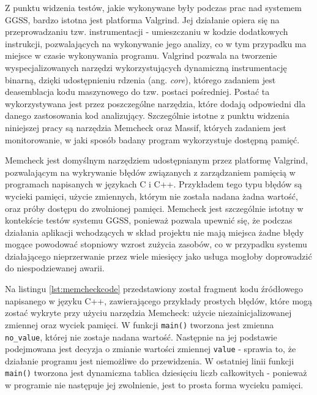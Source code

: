 Z punktu widzenia testów, jakie wykonywane były podczas prac nad systemem GGSS, bardzo istotna jest platforma Valgrind. Jej działanie opiera się na przeprowadzaniu tzw. instrumentacji - umieszczaniu w kodzie dodatkowych instrukcji, pozwalających na wykonywanie jego analizy, co w tym przypadku ma miejsce w czasie wykonywania programu. Valgrind pozwala na tworzenie wyspecjalizowanych narzędzi wykorzystujących dynamiczną instrumentację binarną, dzięki udostępnieniu rdzenia (ang. \emph{core}), którego zadaniem jest deasemblacja kodu maszynowego do tzw. postaci pośredniej. Postać ta wykorzystywana jest przez poszczególne narzędzia, które dodają odpowiedni dla danego zastosowania kod analizujący. Szczególnie istotne z punktu widzenia niniejszej pracy są narzędzia Memcheck oraz Massif, których zadaniem jest monitorowanie, w jaki sposób badany program wykorzystuje dostępną pamięć.

Memcheck jest domyślnym narzędziem udostępnianym przez platformę Valgrind, pozwalającym na wykrywanie błędów związanych z zarządzaniem pamięcią w programach napisanych w językach C i C++. Przykładem tego typu błędów są wycieki pamięci, użycie zmiennych, którym nie została nadana żadna wartość, oraz próby dostępu do zwolnionej pamięci. Memcheck jest szczególnie istotny w kontekście testów systemu GGSS, ponieważ pozwala upewnić się, że podczas działania aplikacji wchodzących w skład projektu nie mają miejsca żadne błędy mogące powodować stopniowy wzrost zużycia zasobów, co w przypadku systemu działającego nieprzerwanie przez wiele miesięcy jako usługa mogłoby doprowadzić do niespodziewanej awarii. 

Na listingu \ref{lst:memcheckcode} przedstawiony został fragment kodu źródłowego napisanego w języku C++, zawierającego przykłady prostych błędów, które mogą zostać wykryte przy użyciu narzędzia Memcheck: użycie niezainicjalizowanej zmiennej oraz wyciek pamięci. W funkcji \lstinline{main()} tworzona jest zmienna \lstinline{no_value}, której nie zostaje nadana wartość. Następnie na jej podstawie podejmowana jest decyzja o zmianie wartości zmiennej \lstinline{value} - sprawia to, że działanie programu jest niemożliwe do przewidzenia. W ostatniej linii funkcji \lstinline{main()} tworzona jest dynamiczna tablica dziesięciu liczb całkowitych - ponieważ w programie nie następuje jej zwolnienie, jest to prosta forma wycieku pamięci.



